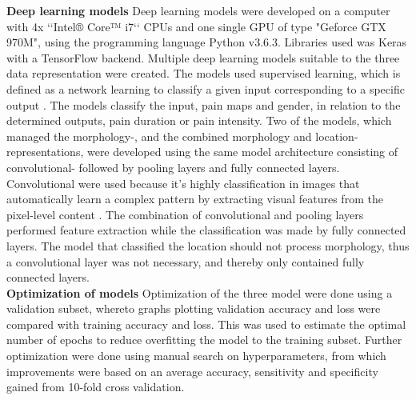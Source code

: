 \noindent
\textbf{Deep learning models}\newline
\noindent
Deep learning models were developed on a computer with 4x ‘‘Intel® Core™ i7‘‘ CPUs and one single GPU of type "Geforce GTX 970M", using the programming language Python v3.6.3. Libraries used was Keras with a TensorFlow backend. \newline
\noindent
Multiple deep learning models suitable to the three data representation were created. The models used supervised learning, which is defined as a network learning to classify a given input corresponding to a specific output \citep{Goodfellow2016}. The models classify the input, pain maps and gender, in relation to the determined outputs, pain duration or pain intensity.\newline
\noindent
Two of the models, which managed the morphology-, and the combined morphology and location-representations, were developed using the same model architecture consisting of convolutional- followed by pooling layers and fully connected layers. Convolutional were used because it’s highly classification in images that automatically learn a complex pattern by extracting visual features from the pixel-level content \citep{Acquarelli2017,LeCun1998}. The combination of convolutional and pooling layers performed feature extraction while the classification was made by fully connected layers. \newline
\noindent
The model that classified the location should not process morphology, thus a convolutional layer was not necessary, and thereby only contained fully connected layers. \\


\noindent
\textbf{Optimization of models}\newline
\noindent
Optimization of the three model were done using a validation subset, whereto graphs plotting validation accuracy and loss were compared with training accuracy and loss. This was used to estimate the optimal number of epochs to reduce overfitting the model to the training subset. Further optimization were done using manual search on hyperparameters, from which improvements were based on an average accuracy, sensitivity and specificity gained from 10-fold cross validation.  




